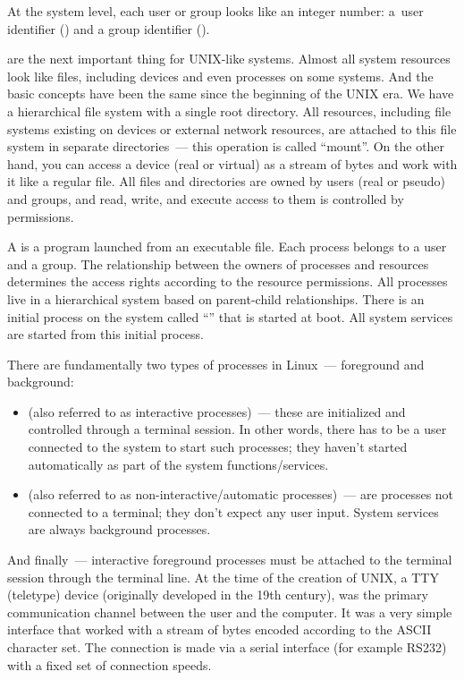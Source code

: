 At the system level, each user or group looks like an integer number:
a~user identifier () and a group identifier ().

 are the next important thing for UNIX-like systems. Almost
all system resources look like files, including devices and even
processes on some systems. And the basic concepts have been the same
since the beginning of the UNIX era. We have a hierarchical file system
with a single root directory. All resources, including file systems
existing on devices or external network resources, are attached to this
file system in separate directories~--- this operation is called
``mount''. On the other hand, you can access a device (real or virtual)
as a stream of bytes and work with it like a regular file. All files and
directories are owned by users (real or pseudo) and groups, and read,
write, and execute access to them is controlled by permissions.

A  is a program launched from an executable file. Each process
belongs to a user and a group. The relationship between the owners of
processes and resources determines the access rights according to
the resource permissions. All processes live in a hierarchical system based
on parent-child relationships. There is an initial process on the system
called ``'' that is started at boot. All system services are started
from this initial process.

There are fundamentally two types of processes in Linux~--- foreground and
background:
\begin{itemize}
\item {} (also referred to as interactive processes)~---
      these are initialized and controlled through a terminal session.
      In other words, there has to be a user connected to the system to start
      such processes; they haven’t started automatically as part of the system
      functions/services.
\item {} (also referred to as non-interactive/automatic
      processes)~--- are processes not connected to a terminal; they don’t
      expect any user input. System services are always background processes.
\end{itemize}

And finally~--- interactive foreground processes must be attached to
the terminal session through the terminal line. At the time of the creation of
UNIX, a TTY (teletype) device (originally developed in the 19th century),
was the primary communication channel between the user and the computer.
It was a very simple interface that worked with a stream of bytes encoded
according to the ASCII character set. The connection is made via a serial
interface (for example RS232) with a fixed set of connection speeds.

